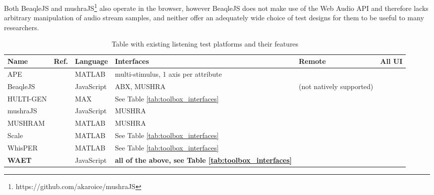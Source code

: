 \documentclass{sig-alternate}
\begin{document}
	Both BeaqleJS \cite{beaqlejs} and mushraJS\footnote{https://github.com/akaroice/mushraJS} also operate in the browser, however BeaqleJS does not make use of the Web Audio API and therefore lacks arbitrary manipulation of audio stream samples, and neither offer an adequately wide choice of test designs for them to be useful to many researchers. %
	
	\begin{table*}[ht]
    \caption{Table with existing listening test platforms and their features}
    \begin{center}
    	\begin{tabular}{|*{6}{l|}}
    		\hline
    		\textbf{Name} 	& \textbf{Ref.} 	& \textbf{Language} 	& \textbf{Interfaces} 			& \textbf{Remote} 			& \textbf{All UI} 	\\
    		\hline
    		APE 			& \cite{ape}		& MATLAB				& multi-stimulus, 1 axis per attribute 	& 					& 			 \\
    		BeaqleJS		& \cite{beaqlejs}	& JavaScript			& ABX, MUSHRA 					& (not natively supported) 	& 			 \\
    		HULTI-GEN 		& \cite{hultigen}	& MAX 					& See Table \ref{tab:toolbox_interfaces}& 							& \checkmark \\
    		mushraJS		& 					& JavaScript 			& MUSHRA 						& \checkmark				& 	 \\
    		MUSHRAM			& \cite{mushram}	& MATLAB				& MUSHRA						& 							& 			 \\
    		Scale 			& \cite{scale}		& MATLAB				& See Table \ref{tab:toolbox_interfaces} &							&			 \\
    		WhisPER			& \cite{whisper}	& MATLAB				& See Table \ref{tab:toolbox_interfaces}								&							& \checkmark \\
    		\textbf{WAET}	& \cite{waet}		& JavaScript			& \textbf{all of the above, see Table \ref{tab:toolbox_interfaces}}		& \checkmark				& \checkmark \\
    		\hline
    	\end{tabular}
    \end{center}
    \label{tab:toolboxes}
    \end{table*}%
\end{document}
